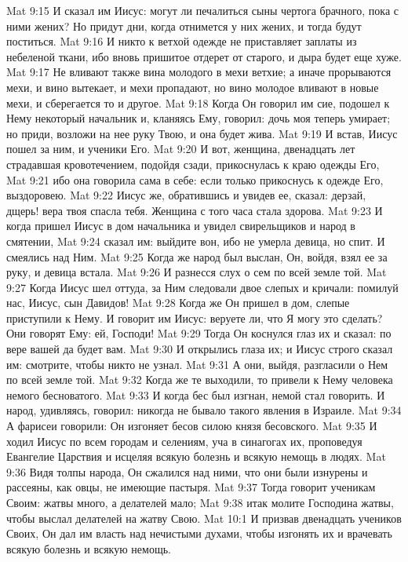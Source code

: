 Mat 9:15  И сказал им Иисус: могут ли печалиться сыны чертога брачного, пока с ними жених? Но придут дни, когда отнимется у них жених, и тогда будут поститься.
Mat 9:16  И никто к ветхой одежде не приставляет заплаты из небеленой ткани, ибо вновь пришитое отдерет от старого, и дыра будет еще хуже.
Mat 9:17  Не вливают также вина молодого в мехи ветхие; а иначе прорываются мехи, и вино вытекает, и мехи пропадают, но вино молодое вливают в новые мехи, и сберегается то и другое.
Mat 9:18  Когда Он говорил им сие, подошел к Нему некоторый начальник и, кланяясь Ему, говорил: дочь моя теперь умирает; но приди, возложи на нее руку Твою, и она будет жива.
Mat 9:19  И встав, Иисус пошел за ним, и ученики Его.
Mat 9:20  И вот, женщина, двенадцать лет страдавшая кровотечением, подойдя сзади, прикоснулась к краю одежды Его,
Mat 9:21  ибо она говорила сама в себе: если только прикоснусь к одежде Его, выздоровею.
Mat 9:22  Иисус же, обратившись и увидев ее, сказал: дерзай, дщерь! вера твоя спасла тебя. Женщина с того часа стала здорова.
Mat 9:23  И когда пришел Иисус в дом начальника и увидел свирельщиков и народ в смятении,
Mat 9:24  сказал им: выйдите вон, ибо не умерла девица, но спит. И смеялись над Ним.
Mat 9:25  Когда же народ был выслан, Он, войдя, взял ее за руку, и девица встала.
Mat 9:26  И разнесся слух о сем по всей земле той.
Mat 9:27  Когда Иисус шел оттуда, за Ним следовали двое слепых и кричали: помилуй нас, Иисус, сын Давидов!
Mat 9:28  Когда же Он пришел в дом, слепые приступили к Нему. И говорит им Иисус: веруете ли, что Я могу это сделать? Они говорят Ему: ей, Господи!
Mat 9:29  Тогда Он коснулся глаз их и сказал: по вере вашей да будет вам.
Mat 9:30  И открылись глаза их; и Иисус строго сказал им: смотрите, чтобы никто не узнал.
Mat 9:31  А они, выйдя, разгласили о Нем по всей земле той.
Mat 9:32  Когда же те выходили, то привели к Нему человека немого бесноватого.
Mat 9:33  И когда бес был изгнан, немой стал говорить. И народ, удивляясь, говорил: никогда не бывало такого явления в Израиле.
Mat 9:34  А фарисеи говорили: Он изгоняет бесов силою князя бесовского.
Mat 9:35  И ходил Иисус по всем городам и селениям, уча в синагогах их, проповедуя Евангелие Царствия и исцеляя всякую болезнь и всякую немощь в людях.
Mat 9:36  Видя толпы народа, Он сжалился над ними, что они были изнурены и рассеяны, как овцы, не имеющие пастыря.
Mat 9:37  Тогда говорит ученикам Своим: жатвы много, а делателей мало;
Mat 9:38  итак молите Господина жатвы, чтобы выслал делателей на жатву Свою.
Mat 10:1  И призвав двенадцать учеников Своих, Он дал им власть над нечистыми духами, чтобы изгонять их и врачевать всякую болезнь и всякую немощь.
